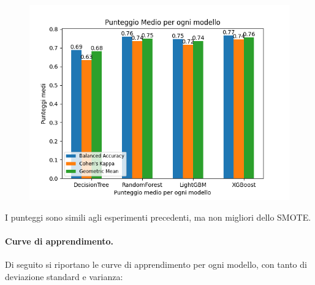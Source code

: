 \begin{figure}[H]
    \centering
    \includegraphics[scale=0.7]{img/adasyn_metrics.png}
\end{figure}

\noindent I punteggi sono simili agli esperimenti precedenti, ma non migliori dello SMOTE.

\paragraph{Curve di apprendimento.} Di seguito si riportano le curve di apprendimento per ogni modello, con tanto di deviazione standard e varianza:

